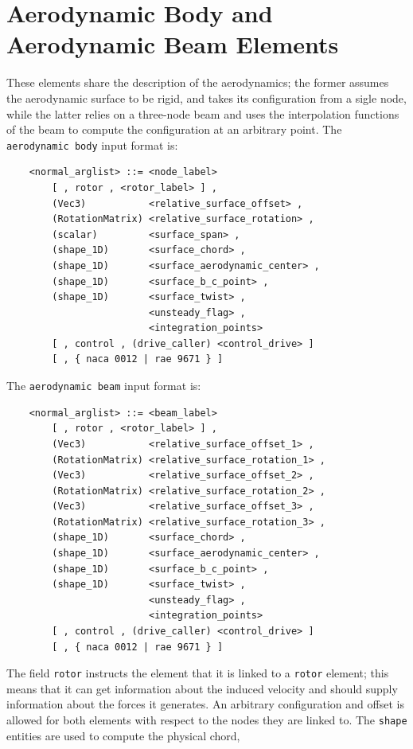 \documentclass[10pt,dvips]{report}
\begin{document}
\section{Aerodynamic Body and Aerodynamic Beam Elements}
These elements share the description of the aerodynamics; the former assumes
the aerodynamic surface to be rigid, and takes its configuration from a
sigle node, while the latter relies on a three-node beam and uses the
interpolation functions of the beam to compute the configuration at an 
arbitrary point.
The {\tt aerodynamic body} input format is:
\begin{verbatim}
    <normal_arglist> ::= <node_label> 
        [ , rotor , <rotor_label> ] ,
        (Vec3)           <relative_surface_offset> , 
        (RotationMatrix) <relative_surface_rotation> ,
        (scalar)         <surface_span> ,
        (shape_1D)       <surface_chord> ,
        (shape_1D)       <surface_aerodynamic_center> ,
        (shape_1D)       <surface_b_c_point> ,
        (shape_1D)       <surface_twist> ,
                         <unsteady_flag> ,
                         <integration_points>
        [ , control , (drive_caller) <control_drive> ] 
        [ , { naca 0012 | rae 9671 } ]
\end{verbatim}
The {\tt aerodynamic beam} input format is:
\begin{verbatim}
    <normal_arglist> ::= <beam_label> 
        [ , rotor , <rotor_label> ] ,
        (Vec3)           <relative_surface_offset_1> ,       
        (RotationMatrix) <relative_surface_rotation_1> ,
        (Vec3)           <relative_surface_offset_2> ,
        (RotationMatrix) <relative_surface_rotation_2> ,
        (Vec3)           <relative_surface_offset_3> ,       
        (RotationMatrix) <relative_surface_rotation_3> ,
        (shape_1D)       <surface_chord> ,
        (shape_1D)       <surface_aerodynamic_center> ,
        (shape_1D)       <surface_b_c_point> ,
        (shape_1D)       <surface_twist> ,
                         <unsteady_flag> ,
                         <integration_points>
        [ , control , (drive_caller) <control_drive> ] 
        [ , { naca 0012 | rae 9671 } ]
\end{verbatim}
The field {\tt rotor} instructs the element that it is linked to a 
{\tt rotor} element; this means that it can get information about the
induced velocity and should supply information about the forces it generates.
An arbitrary configuration and offset is allowed for both elements with
respect to the nodes they are linked to. 
The {\tt shape} entities are used to compute the physical chord,
\end{document}
